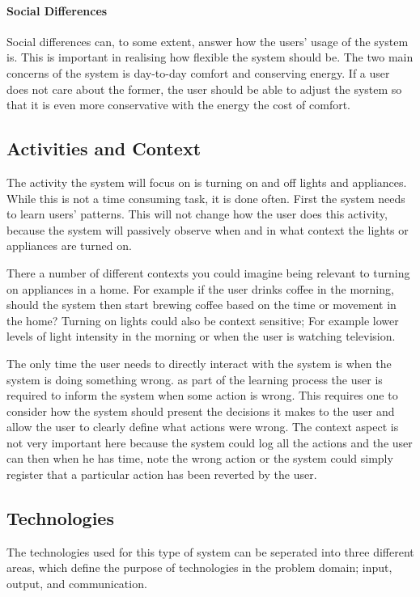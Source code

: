 \paragraph{Social Differences}
Social differences can, to some extent, answer how the users' usage of
the system is. This is important in realising how flexible the system should be.
The two main concerns of the system is day-to-day comfort and conserving energy.
If a user does not care about the former, the user should be able to adjust the system so that it is even more conservative with the energy the cost of comfort.

\subsection{Activities and Context}
The activity the system will focus on is turning on and off lights and
appliances. While this is not a time consuming task, it is done often. First the
system needs to learn users' patterns. This will not change how the user does
this activity, because the system will passively observe when and in what
context the lights or appliances are turned on.

There a number of different
contexts you could imagine being relevant to turning on appliances in a home.
For example if the user drinks coffee in the morning, should the system then
start brewing coffee based on the time or movement in the home? Turning on
lights could also be context sensitive; For example lower levels of light
intensity in the morning or when the user is watching television.

The only time the user needs to directly interact with the system is when the system is doing something wrong. as part of the learning process the user is required to inform the system when some action is wrong. This requires one to consider how the system should present the decisions it makes to the user and allow the user to clearly define what actions were wrong. The context aspect is not very important here because the system could log all the actions and the user can then when he has time, note the wrong action or the system could simply register that a particular action has been reverted by the user.

\subsection{Technologies}
\label{sub:Technologies}
The technologies used for this type of system can be seperated into three different areas, which define the purpose of technologies in the problem domain; input, output, and communication.
